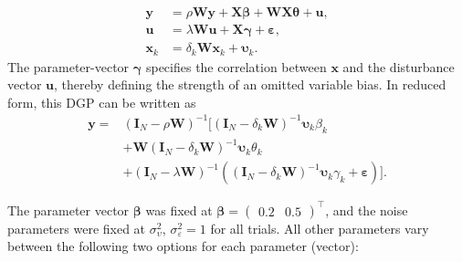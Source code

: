 \documentclass[
  letterpaper,
]{scrbook}
\begin{document}
\[
\begin{split}
{\boldsymbol{\mathbf{y}}}&=\rho{\boldsymbol{\mathbf{W}}}{\boldsymbol{\mathbf{y}}}+{\boldsymbol{\mathbf{X}}}{\boldsymbol{\mathbf{\beta}}}+{\boldsymbol{\mathbf{W}}}{\boldsymbol{\mathbf{X}}}{\boldsymbol{\mathbf{\theta}}}+ {\boldsymbol{\mathbf{u}}},\\ 
{\boldsymbol{\mathbf{u}}}&=\lambda{\boldsymbol{\mathbf{W}}}{\boldsymbol{\mathbf{u}}}+{\boldsymbol{\mathbf{X}}}{\boldsymbol{\mathbf{\gamma}}}+{\boldsymbol{\mathbf{\varepsilon}}},\\
{\boldsymbol{\mathbf{x}}}_k&=\delta_k{\boldsymbol{\mathbf{W}}}{\boldsymbol{\mathbf{x}}}_k+{\boldsymbol{\mathbf{\upsilon}}}_k.
\end{split}
\] The parameter-vector \({\boldsymbol{\mathbf{\gamma}}}\) specifies the
correlation between \({\boldsymbol{\mathbf{x}}}\) and the disturbance
vector \({\boldsymbol{\mathbf{u}}}\), thereby defining the strength of
an omitted variable bias. In reduced form, this DGP can be written as \[
\begin{split}
{\boldsymbol{\mathbf{y}}}=&({\boldsymbol{\mathbf{I}}_N}-\rho {\boldsymbol{\mathbf{W}}})^{-1}\big[({\boldsymbol{\mathbf{I}}_N}-\delta_k {\boldsymbol{\mathbf{W}}})^{-1}{\boldsymbol{\mathbf{\upsilon}}_k}\beta_k \\
&+{\boldsymbol{\mathbf{W}}}({\boldsymbol{\mathbf{I}}_N}-\delta_k {\boldsymbol{\mathbf{W}}})^{-1}{\boldsymbol{\mathbf{\upsilon}}_k}\theta_k \\
&+({\boldsymbol{\mathbf{I}}_N}-\lambda {\boldsymbol{\mathbf{W}}})^{-1}(({\boldsymbol{\mathbf{I}}_N}-\delta_k {\boldsymbol{\mathbf{W}}})^{-1}{\boldsymbol{\mathbf{\upsilon}}_k}\gamma_k+{\boldsymbol{\mathbf{\varepsilon}}})\big].
\end{split}
\]

The parameter vector \({\boldsymbol{\mathbf{\beta}}}\) was fixed at
\({\boldsymbol{\mathbf{\beta}}}=%
\begin{pmatrix}0.2&0.5\end{pmatrix}
^\intercal\), and the noise parameters were fixed at
\(\sigma^{2}_\upsilon\), \(\sigma^{2}_\varepsilon=1\) for all trials.
All other parameters vary between the following two options for each
parameter (vector):
\end{document}

